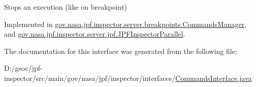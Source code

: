 Stops an execution (like on breakpoint) 



Implemented in \hyperlink{classgov_1_1nasa_1_1jpf_1_1inspector_1_1server_1_1breakpoints_1_1_commands_manager_ad3de2e0a6d30af40d0167bb7ec11f305}{gov.\+nasa.\+jpf.\+inspector.\+server.\+breakpoints.\+Commands\+Manager}, and \hyperlink{classgov_1_1nasa_1_1jpf_1_1inspector_1_1server_1_1jpf_1_1_j_p_f_inspector_parallel_a463604600d1f706e87ace1aeb2c4ef39}{gov.\+nasa.\+jpf.\+inspector.\+server.\+jpf.\+J\+P\+F\+Inspector\+Parallel}.



The documentation for this interface was generated from the following file\+:\begin{DoxyCompactItemize}
\item 
D\+:/gsoc/jpf-\/inspector/src/main/gov/nasa/jpf/inspector/interfaces/\hyperlink{_commands_interface_8java}{Commands\+Interface.\+java}\end{DoxyCompactItemize}
